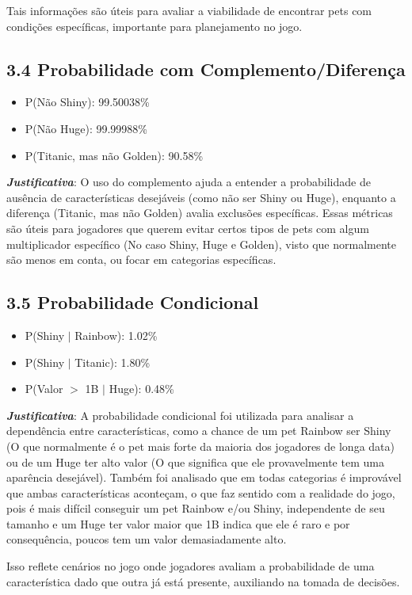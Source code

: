 \documentclass[12pt]{article}
\begin{document}
Tais informações são úteis para avaliar a viabilidade de encontrar pets com condições específicas, importante para planejamento no jogo.

\subsection*{3.4 Probabilidade com Complemento/Diferença}
\begin{itemize}
    \item P(Não Shiny): 99.50038\%
    \item P(Não Huge): 99.99988\%
    \item P(Titanic, mas não Golden): 90.58\%
\end{itemize}
\textbf{\textit{Justificativa}}: O uso do complemento ajuda a entender a probabilidade de ausência de características desejáveis (como não ser Shiny ou Huge), enquanto a diferença (Titanic, mas não Golden) avalia exclusões específicas. Essas métricas são úteis para jogadores que querem evitar certos tipos de pets com algum multiplicador específico (No caso Shiny, Huge e Golden), visto que normalmente são menos em conta, ou focar em categorias específicas.   

\subsection*{3.5 Probabilidade Condicional}
\begin{itemize}
    \item P(Shiny $|$ Rainbow):  1.02\%
    \item P(Shiny $|$ Titanic): 1.80\%
    \item P(Valor $>$ 1B $|$ Huge): 0.48\%
\end{itemize}
\textbf{\textit{Justificativa}}: A probabilidade condicional foi utilizada para analisar a dependência entre características, como a chance de um pet Rainbow ser Shiny (O que normalmente é o pet mais forte da maioria dos jogadores de longa data) ou de um Huge ter alto valor (O que significa que ele provavelmente tem uma aparência desejável).
Também foi analisado que em todas categorias é improvável que ambas características aconteçam, o que faz sentido com a realidade do jogo, pois é mais difícil conseguir um pet Rainbow e/ou Shiny, independente de seu tamanho e um Huge ter valor maior que 1B indica que ele é raro e por consequência, poucos tem um valor demasiadamente alto.

Isso reflete cenários no jogo onde jogadores avaliam a probabilidade de uma característica dado que outra já está presente, auxiliando na tomada de decisões.
\end{document}
